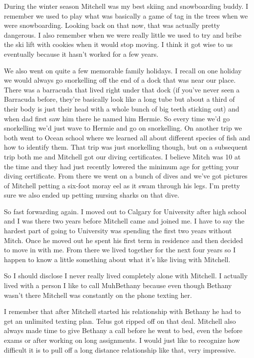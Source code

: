 During the winter season Mitchell was my best skiing and snowboarding buddy. I remember we used to play what was basically a game of tag in the trees when we were snowboarding. Looking back on that now, that was actually pretty dangerous. I also remember when we were really little we used to try and bribe the ski lift with cookies when it would stop moving. I think it got wise to us eventually because it hasn't worked for a few years.

We also went on quite a few memorable family holidays. I recall on one holiday we would always go snorkelling off the end of a dock that was near our place. There was a barracuda that lived right under that dock (if you've never seen a Barracuda before, they're basically look like a long tube but about a third of their body is just their head with a whole bunch of big teeth sticking out) and when dad first saw him there he named him Hermie. So every time we'd go snorkelling we'd just wave to Hermie and go on snorkelling. On another trip we both went to Ocean school where we learned all about different species of fish and how to identify them. That trip was just snorkelling though, but on a subsequent trip both me and Mitchell got our diving certificates. I believe Mitch was 10 at the time and they had just recently lowered the minimum age for getting your diving certificate. From there we went on a bunch of dives and we've got pictures of Mitchell petting a six-foot moray eel as it swam through his legs. I'm pretty sure we also ended up petting nursing sharks on that dive.

So fast forwarding again. I moved out to Calgary for University after high school and I was there two years before Mitchell came and joined me. I have to say the hardest part of going to University was spending the first two years without Mitch. Once he moved out he spent his first term in residence and then decided to move in with me. From there we lived together for the next four years so I happen to know a little something about what it's like living with Mitchell.

So I should disclose I never really lived completely alone with Mitchell. I actually lived with a person I like to call MuhBethany because even though Bethany wasn't there Mitchell was constantly on the phone texting her.

I remember that after Mitchell started his relationship with Bethany he had to get an unlimited texting plan. Telus got ripped off on that deal. Mitchell also always made time to give Bethany a call before he went to bed, even the before exams or after working on long assignments. I would just like to recognize how difficult it is to pull off a long distance relationship like that, very impressive.

